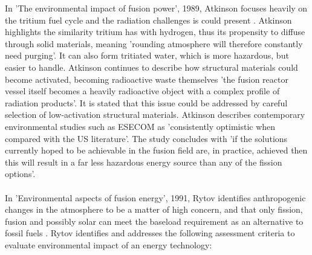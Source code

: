 In 'The environmental impact of fusion power', 1989, Atkinson focuses heavily on the tritium fuel cycle and the radiation challenges is could present \cite{atkinson1989environmental}. Atkinson highlights the similarity tritium has with hydrogen, thus its propensity to diffuse through solid materials, meaning 'rounding atmosphere will therefore constantly need purging'. It can also form tritiated water, which is more hazardous, but easier to handle. Atkinson continues to describe how structural materials could become activated, becoming radioactive waste themselves 'the fusion reactor vessel itself becomes a heavily  radioactive object with a complex profile of radiation products'. It is stated that this issue could be addressed by careful selection of low-activation structural materials. Atkinson describes contemporary environmental studies such as ESECOM as 'consistently optimistic when compared with the US literature'. The study concludes with 'if the solutions  currently hoped to be achievable in the fusion field  are, in practice, achieved then this will result in a far less hazardous energy source than any of the fission options'.
\\\\
In 'Environmental aspects of fusion energy', 1991, Rytov identifies anthropogenic changes in the atmosphere to be a matter of high concern, and that only fission, fusion and possibly solar can meet the baseload requirement as an alternative to fossil fuels \cite{rytov1992environmental}. Rytov identifies and addresses the following assessment criteria to evaluate environmental impact of an energy technology: 
